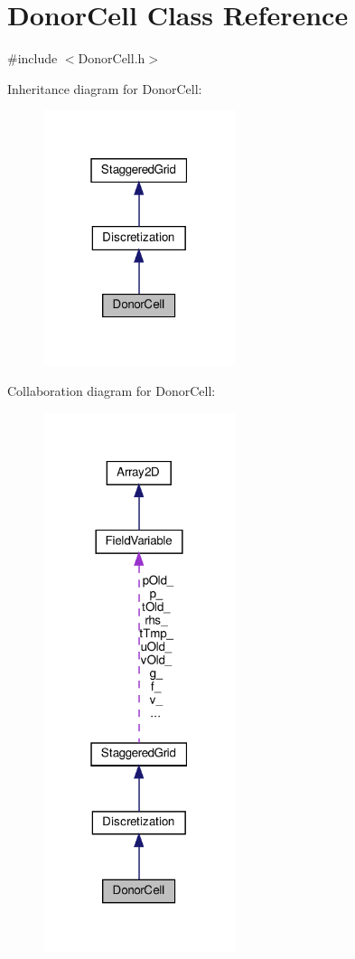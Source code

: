 \hypertarget{classDonorCell}{}\section{Donor\+Cell Class Reference}
\label{classDonorCell}


{\ttfamily \#include $<$Donor\+Cell.\+h$>$}



Inheritance diagram for Donor\+Cell\+:\nopagebreak
\begin{figure}[H]
\begin{center}
\leavevmode
\includegraphics[width=159pt]{classDonorCell__inherit__graph}
\end{center}
\end{figure}


Collaboration diagram for Donor\+Cell\+:\nopagebreak
\begin{figure}[H]
\begin{center}
\leavevmode
\includegraphics[width=159pt]{classDonorCell__coll__graph}
\end{center}
\end{figure}
